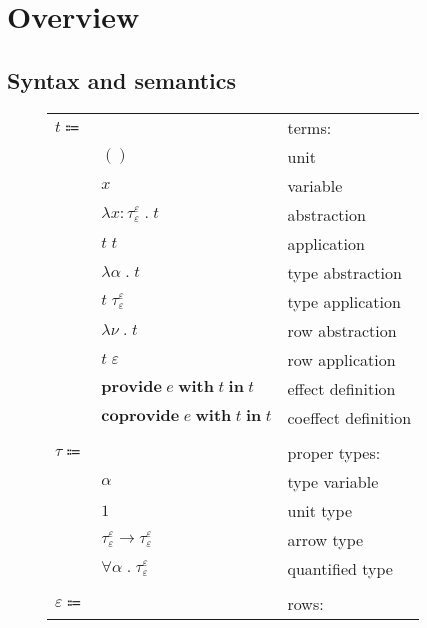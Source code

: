 \documentclass[12pt]{article}
\newcommand\anno[2]{#1 : #2}
\newcommand\term{t}
\newcommand\eunit{()}
\newcommand\evar{x}
\newcommand\eabs[2]{\lambda #1 \; . \; #2}
\newcommand\eapp[2]{#1 \; #2}
\newcommand\etabs[2]{\lambda #1 \; . \; #2}
\newcommand\etapp[2]{#1 \; #2}
\newcommand\eprovide[3]{\textbf{provide} \; #1 \; \textbf{with} \; #2 \; \textbf{in} \; #3}
\newcommand\ecoprovide[3]{\textbf{coprovide} \; #1 \; \textbf{with} \; #2 \; \textbf{in} \; #3}
\newcommand\tembellished[3]{{#1}^{#2}_{#3}}
\newcommand\proper{\tau}
\newcommand\tvar{\alpha}
\newcommand\tunit{1}
\newcommand\tarrow[2]{#1 \rightarrow #2}
\newcommand\tforall[2]{\forall #1 \; . \; #2}
\newcommand\row{\varepsilon}
\newcommand\rvar{\nu}
\newcommand\effect{e}
\begin{document}
  \section{Overview}

    \subsection{Syntax and semantics}

      \begin{figure}[H]
        \begin{mdframed}[backgroundcolor=none]
          \begin{center}
            \begin{tabular}{l l l}
              $\term \Coloneqq $ & & terms: \\
              & $\eunit$ & unit \\
              & $\evar$ & variable \\
              & $\eabs{\anno{\evar}{\tembellished{\proper}{\row}{\row}}}{\term}$ & abstraction \\
              & $\eapp{\term}{\term}$ & application \\
              & $\etabs{\tvar}{\term}$ & type abstraction \\
              & $\etapp{\term}{\tembellished{\proper}{\row}{\row}}$ & type application \\
              & $\etabs{\rvar}{\term}$ & row abstraction \\
              & $\etapp{\term}{\row}$ & row application \\
              & $\eprovide{\effect}{\term}{\term}$ & effect definition \\
              & $\ecoprovide{\effect}{\term}{\term}$ & coeffect definition \\
              \\
              $\proper \Coloneqq$ & & proper types: \\
              & $\tvar$ & type variable \\
              & $\tunit$ & unit type \\
              & $\tarrow{\tembellished{\proper}{\row}{\row}}{\tembellished{\proper}{\row}{\row}}$ & arrow type \\
              & $\tforall{\tvar}{\tembellished{\proper}{\row}{\row}}$ & quantified type \\
              \\
              $\row \Coloneqq$ & & rows: \\

\end{tabular}
\end{center}
\end{mdframed}
\end{figure}
\end{document}
